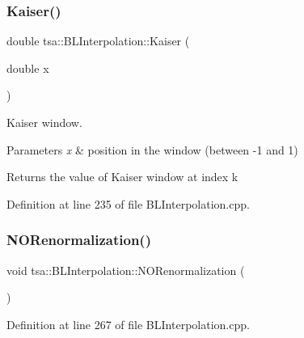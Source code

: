 \mbox{\label{classtsa_1_1_b_l_interpolation_a8eeac8a3a0439f46764cf1455bd2febe}} 
\subsubsection{\texorpdfstring{Kaiser()}{Kaiser()}}
{\footnotesize\ttfamily double tsa\+::\+B\+L\+Interpolation\+::\+Kaiser (\begin{DoxyParamCaption}\item[{double}]{x }\end{DoxyParamCaption})\hspace{0.3cm}{\ttfamily [private]}}

Kaiser window.


\begin{DoxyParams}{Parameters}
{\em x} & position in the window (between -\/1 and 1)\\
\hline
\end{DoxyParams}
\begin{DoxyReturn}{Returns}
the value of Kaiser window at index k 
\end{DoxyReturn}


Definition at line 235 of file B\+L\+Interpolation.\+cpp.

\mbox{\label{classtsa_1_1_b_l_interpolation_a7b429b2867b887e3fec9d44c584f026c}} 
\subsubsection{\texorpdfstring{N\+O\+Renormalization()}{NORenormalization()}}
{\footnotesize\ttfamily void tsa\+::\+B\+L\+Interpolation\+::\+N\+O\+Renormalization (\begin{DoxyParamCaption}{ }\end{DoxyParamCaption})\hspace{0.3cm}{\ttfamily [private]}}



Definition at line 267 of file B\+L\+Interpolation.\+cpp.

